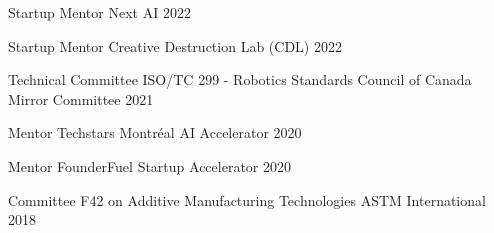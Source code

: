 \documentclass[11pt, letterpaper]{awesome-cv}
\begin{document}
\begin{cvhonors}
    \cvhonor
    {Startup Mentor}
    {Next AI}
    {}
    {2022}

    \cvhonor
    {Startup Mentor}
    {Creative Destruction Lab (CDL)}
    {}
    {2022}

    \cvhonor
    {Technical Committee ISO/TC 299 - Robotics}
    {Standards Council of Canada Mirror Committee}
    {}
    {2021}

    \cvhonor
    {Mentor}
    {Techstars Montréal AI Accelerator}
    {}
    {2020}

    \cvhonor
    {Mentor}
    {FounderFuel Startup Accelerator}
    {}
    {2020}

    \cvhonor
    {Committee F42 on Additive Manufacturing Technologies}
    {ASTM International}
    {}
    {2018}
\end{cvhonors}
\end{document}
